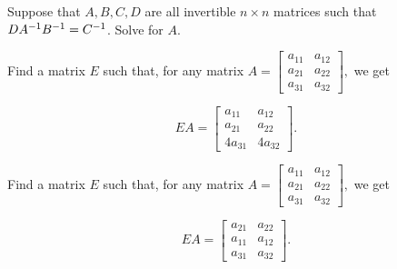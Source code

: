 \endedxproblem


Suppose that $A,B,C,D$ are all invertible $n\times n$ matrices such that
$DA^{-1} B^{-1} = C^{-1}$.  Solve for $A$.  



\edXsolution{ 
 }
 
\endedxproblem


\endedxvertical




Find a matrix $E$ such that, for any matrix
$A =   \left[ \begin{array}{cc} a_{11} & a_{12}  \\
a_{21} & a_{22}  \\ 
a_{31} & a_{32}  
 \end{array} \right],$ we get

\[EA = \left[ \begin{array}{cc} a_{11} & a_{12}  \\
a_{21} & a_{22}  \\ 
4a_{31} & 4a_{32}  
 \end{array} \right].\]





\edXsolution{

}

\endedxproblem





Find a matrix $E$ such that, for any matrix
$A =   \left[ \begin{array}{cc} a_{11} & a_{12}  \\
a_{21} & a_{22}  \\ 
a_{31} & a_{32}  
 \end{array} \right],$ we get

\[EA = \left[ \begin{array}{cc} a_{21} & a_{22}  \\
a_{11} & a_{12}  \\ 
a_{31} & a_{32}  
 \end{array} \right].\]


